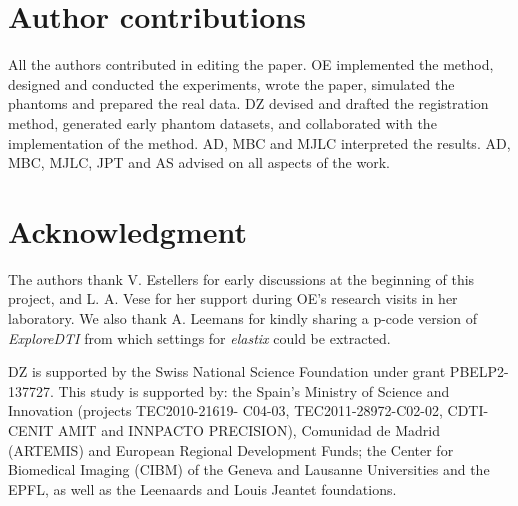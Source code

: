 \section*{Author contributions}
All the authors contributed in editing the paper.
OE implemented the method, designed and conducted the experiments, wrote the paper,
  simulated the phantoms and prepared the real data.
DZ devised and drafted the registration method, generated early phantom datasets, and
  collaborated with the implementation of the method.
AD, MBC and MJLC interpreted the results.
AD, MBC, MJLC, JPT and AS advised on all aspects of the work.

\section*{Acknowledgment}
The authors thank V. Estellers for early discussions at the beginning of this project,
  and L. A. Vese for her support during OE's research visits in her laboratory.
We also thank A. Leemans for kindly sharing a p-code version of \emph{ExploreDTI} from
  which settings for \emph{elastix} could be extracted.

DZ is supported by the Swiss National Science Foundation under grant PBELP2-137727.
This study is supported by: the Spain's Ministry of Science and Innovation
  (projects TEC2010-21619- C04-03, TEC2011-28972-C02-02, CDTI-CENIT
  AMIT and INNPACTO PRECISION), Comunidad de Madrid (ARTEMIS) and
  European Regional Development Funds; the Center for Biomedical Imaging
  (CIBM) of the Geneva and Lausanne Universities and the EPFL, as well as the
  Leenaards and Louis Jeantet foundations.

